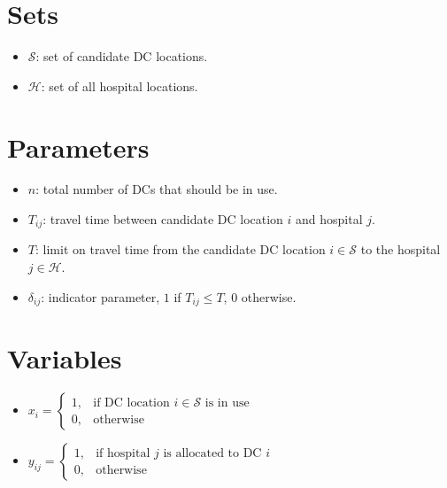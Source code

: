 \documentclass{article}
\begin{document}
\section{Sets}
\begin{itemize}[leftmargin=*,nosep]
    \item $\mathcal{S}$: set of candidate DC locations.
    \item $\mathcal{H}$: set of all hospital locations.
\end{itemize}

\section{Parameters}
\begin{itemize}[leftmargin=*,nosep]
    \item $n$: total number of DCs that should be in use.
    \item $T_{ij}$: travel time between candidate DC location $i$ and hospital $j$.
    \item $T$: limit on travel time from the candidate DC location $i \in \mathcal{S}$ to the hospital $j \in \mathcal{H}$.
    \item $\delta_{ij}$: indicator parameter, $1$ if $T_{ij} \leq T$, $0$ otherwise.
\end{itemize}

\section{Variables}
\begin{itemize}[leftmargin=*,nosep]
    \item $x_i = \begin{cases} 
        1, & \text{if DC location } i \in \mathcal{S} \text{ is in use} \\ 
        0, & \text{otherwise} 
    \end{cases}$
    \item $y_{ij} = \begin{cases} 
        1, & \text{if hospital } j  \text{ is allocated to DC } i \\ 
        0, & \text{otherwise} 
    \end{cases}$
\end{itemize}
\end{document}
